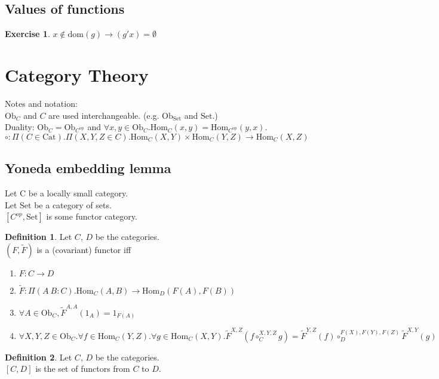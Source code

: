 \documentclass[10pt,a4paper]{article}
\theoremstyle{definition}
\newtheorem{definition}{Definition}[section]
\newtheorem{exercise}{Exercise}[section]
\newcommand{\dom}{{\mbox{dom}}}
\newcommand{\Ob}{{\mbox{Ob}}}
\newcommand{\Cat}{{\mbox{Cat}}}
\newcommand{\Hom}{{\mbox{Hom}}}
\newcommand{\FMor}{{\widetilde{F}\mbox{}}}
\newcommand{\op}{{\mbox{op}}}
\newcommand{\Set}{{\mbox{Set}}}
\begin{document}
\subsection{Values of functions}

\begin{exercise}
$x\notin \dom(g)\to (g'x)=\emptyset$
\end{exercise}


\section{Category Theory}
Notes and notation:\\
$\Ob_C$ and $C$ are used interchangeable. (e.g. $\Ob_\Set$ and $\Set$.)\\
Duality: $\Ob_C = \Ob_{C^\op}$ and 
 $\forall x,y \in \Ob_C. \Hom_C(x,y) = \Hom_{C^\op}(y,x)$.\\
$\circ : \Pi(C\in \Cat).\Pi(X,Y,Z\in C).\Hom_C(X,Y)\times\Hom_C(Y,Z)\to\Hom_C(X,Z)$

\subsection{Yoneda embedding lemma}
Let C be a locally small category.\\
Let Set be a category of sets.\\
$[C^{op},\mbox{Set}]$ is some functor category.\\

\begin{definition}
Let $C$, $D$ be the categories.\\
 $(F, \FMor)$ is a (covariant) functor iff\\
\begin{enumerate}
\item $F:C \to D$
\item $\FMor:\Pi(A\ B:C).\Hom_C(A,B) \to \Hom_D(F(A), F(B))$
\item $\forall A\in \Ob_C, \FMor^{A,A}(1_A)=1_{F(A)}$
\item $\forall X,Y,Z \in \Ob_C.\forall f\in\Hom_C(Y,Z).\forall g\in\Hom_C(X,Y). \FMor^{X,Z}(f\circ_C^{X,Y,Z} g)=\FMor^{Y,Z}(f)\circ_D^{F(X),F(Y),F(Z)} \FMor^{X,Y}(g)$
\end{enumerate}

\end{definition}

\begin{definition}
Let $C$, $D$ be the categories.\\
$[C,D]$ is the set of functors from $C$ to $D$.\\
\end{definition}
\end{document}
